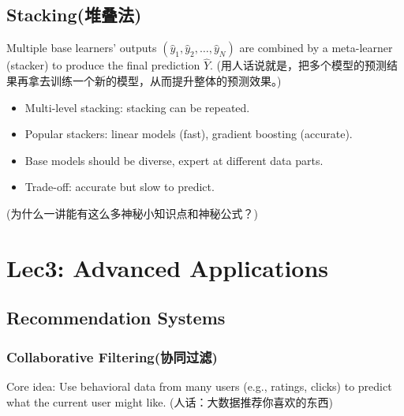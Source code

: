 \documentclass[UTF8]{ctexart}
\begin{document}
\subsection{Stacking(堆叠法)}
Multiple base learners' outputs $(\hat{y}_1, \hat{y}_2, \ldots, \hat{y}_N)$ are combined by a meta-learner (stacker) to produce the final prediction $\hat{Y}$.
(用人话说就是，把多个模型的预测结果再拿去训练一个新的模型，从而提升整体的预测效果。)
\begin{itemize}
    \item Multi-level stacking: stacking can be repeated.
    \item Popular stackers: linear models (fast), gradient boosting (accurate).
    \item Base models should be diverse, expert at different data parts.
    \item Trade-off: accurate but slow to predict.
\end{itemize}
(为什么一讲能有这么多神秘小知识点和神秘公式？)

\newpage
\section{Lec3: Advanced Applications}

\subsection{Recommendation Systems}

\subsubsection{Collaborative Filtering(协同过滤)}
Core idea: Use behavioral data from many users (e.g., ratings, clicks) to predict what the current user might like.
(人话：大数据推荐你喜欢的东西)
\end{document}
